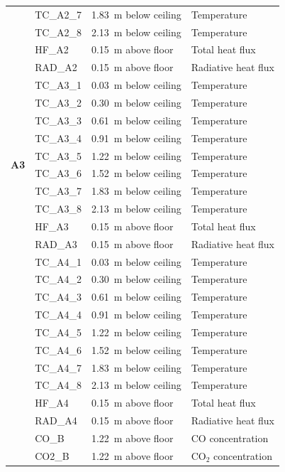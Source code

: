 \documentclass[12pt,oneside]{book}
\begin{document}
\begin{longtable}[c]{c|lll}
 & TC\_A2\_7  & 1.83~m below ceiling & Temperature \\
 & TC\_A2\_8  & 2.13~m below ceiling & Temperature \\
\cline{2-4}
 & HF\_A2	  & 0.15~m above floor   & Total heat flux \\
 & RAD\_A2    & 0.15~m above floor   & Radiative heat flux \\
\midrule
 \multirow{10}{*}{\large{\textbf{A3}}}
 & TC\_A3\_1  & 0.03~m below ceiling & Temperature \\
 & TC\_A3\_2  & 0.30~m below ceiling & Temperature \\
 & TC\_A3\_3  & 0.61~m below ceiling & Temperature \\
 & TC\_A3\_4  & 0.91~m below ceiling & Temperature \\
 & TC\_A3\_5  & 1.22~m below ceiling & Temperature \\
 & TC\_A3\_6  & 1.52~m below ceiling & Temperature \\
 & TC\_A3\_7  & 1.83~m below ceiling & Temperature \\
 & TC\_A3\_8  & 2.13~m below ceiling & Temperature \\
\cline{2-4}
 & HF\_A3	  & 0.15~m above floor   & Total heat flux \\
 & RAD\_A3    & 0.15~m above floor   & Radiative heat flux \\
\bottomrule
\newpage
\multirow{13}{*}{\large\textbf{A4}}
 & TC\_A4\_1  & 0.03~m below ceiling & Temperature \\
 & TC\_A4\_2  & 0.30~m below ceiling & Temperature \\
 & TC\_A4\_3  & 0.61~m below ceiling & Temperature \\
 & TC\_A4\_4  & 0.91~m below ceiling & Temperature \\
 & TC\_A4\_5  & 1.22~m below ceiling & Temperature \\
 & TC\_A4\_6  & 1.52~m below ceiling & Temperature \\
 & TC\_A4\_7  & 1.83~m below ceiling & Temperature \\
 & TC\_A4\_8  & 2.13~m below ceiling & Temperature \\
\cline{2-4}
 & HF\_A4	  & 0.15~m above floor   & Total heat flux \\
 & RAD\_A4    & 0.15~m above floor   & Radiative heat flux \\
\cline{2-4}
 & CO\_B      & 1.22~m above floor   & CO concentration \\
 & CO2\_B     & 1.22~m above floor   & CO$_2$ concentration \\

\end{longtable}
\end{document}
